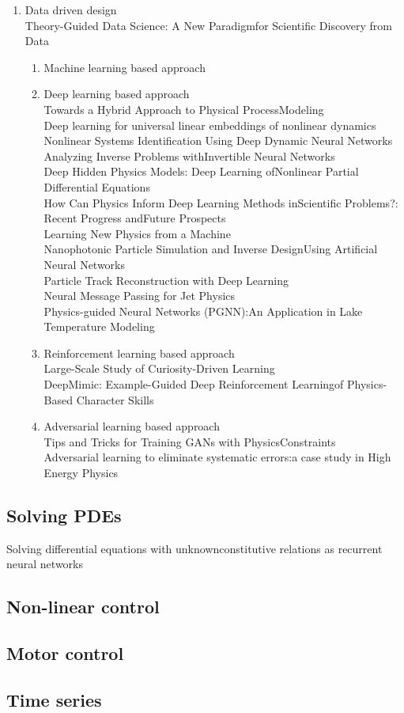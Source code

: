 \documentclass{article}
\begin{document}
\begin{enumerate}
  \item Data driven design \\
  Theory-Guided Data Science: A New Paradigmfor Scientific Discovery from Data \\
  \begin{enumerate}
    \item Machine learning based approach \\
    \item Deep learning based approach \\
      Towards a Hybrid Approach to Physical ProcessModeling \\
      Deep learning for universal linear embeddings of nonlinear dynamics \\
      Nonlinear Systems Identification Using Deep Dynamic Neural Networks \\
      Analyzing Inverse Problems withInvertible Neural Networks \\
      Deep Hidden Physics Models:  Deep Learning ofNonlinear Partial Differential Equations \\
      How Can Physics Inform Deep Learning Methods inScientific Problems?: Recent Progress andFuture Prospects \\
      Learning New Physics from a Machine \\
      Nanophotonic Particle Simulation and Inverse DesignUsing Artificial Neural Networks \\
      Particle Track Reconstruction with Deep Learning \\
      Neural Message Passing for Jet Physics \\
      Physics-guided Neural Networks (PGNN):An Application in Lake Temperature Modeling \\
    \item Reinforcement learning based approach \\
      Large-Scale Study of Curiosity-Driven Learning \\
      DeepMimic: Example-Guided Deep Reinforcement Learningof Physics-Based Character Skills \\
    \item Adversarial learning based approach \\
      Tips and Tricks for Training GANs with PhysicsConstraints \\
      Adversarial learning to eliminate systematic errors:a case study in High Energy Physics \\
  \end{enumerate}

\end{enumerate}

\subsection{Solving PDEs}
Solving differential equations with unknownconstitutive relations as recurrent neural networks \\
\subsection{Non-linear control}
\subsection{Motor control}
\subsection{Time series}
\end{document}
